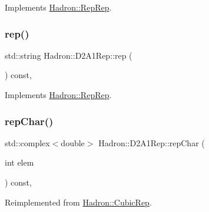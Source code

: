 Implements \mbox{\hyperlink{structHadron_1_1RepRep_ab3213025f6de249f7095892109575fde}{Hadron\+::\+Rep\+Rep}}.

\mbox{\label{structHadron_1_1D2A1Rep_ad489cd29126b2c555a38bb2a5545b2b4}} 
\subsubsection{\texorpdfstring{rep()}{rep()}\hspace{0.1cm}{\footnotesize\ttfamily [3/3]}}
{\footnotesize\ttfamily std\+::string Hadron\+::\+D2\+A1\+Rep\+::rep (\begin{DoxyParamCaption}{ }\end{DoxyParamCaption}) const\hspace{0.3cm}{\ttfamily [inline]}, {\ttfamily [virtual]}}



Implements \mbox{\hyperlink{structHadron_1_1RepRep_ab3213025f6de249f7095892109575fde}{Hadron\+::\+Rep\+Rep}}.

\mbox{\label{structHadron_1_1D2A1Rep_a6c72d27c96ff1d69632ebb7732955c54}} 
\subsubsection{\texorpdfstring{repChar()}{repChar()}\hspace{0.1cm}{\footnotesize\ttfamily [1/2]}}
{\footnotesize\ttfamily std\+::complex$<$double$>$ Hadron\+::\+D2\+A1\+Rep\+::rep\+Char (\begin{DoxyParamCaption}\item[{int}]{elem }\end{DoxyParamCaption}) const\hspace{0.3cm}{\ttfamily [inline]}, {\ttfamily [virtual]}}



Reimplemented from \mbox{\hyperlink{structHadron_1_1CubicRep_af45227106e8e715e84b0af69cd3b36f8}{Hadron\+::\+Cubic\+Rep}}.

